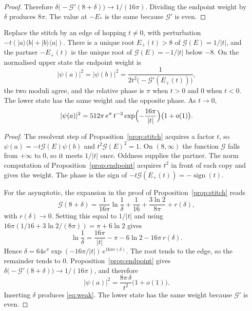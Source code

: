 \begin{proof}
Therefore \(\delta\bigl(-\mathcal{G}'(8+\delta)\bigr)\to 1/(16\pi)\).
Dividing the endpoint weight by \(\delta\) produces \(8\pi\).
The value at \(-E_*\) is the same because \(\mathcal{G}'\) is even.
\end{proof}

\begin{proposition}
\label{prop:weak}
Replace the stitch by an edge of hopping \(t\neq 0\), with perturbation
\(-t(|a\rangle\langle b|+|b\rangle\langle a|)\).
There is a unique root \(E_+(t)>8\) of \(\mathcal{G}(E)=1/|t|\), and the partner
\(-E_+(t)\) is the unique root of \(\mathcal{G}(E)=-1/|t|\) below \(-8\).
On the normalised upper state the endpoint weight is
\[
|\psi(a)|^2=|\psi(b)|^2
=\frac{1}{2t^2\bigl(-\mathcal{G}'(E_+(t))\bigr)},
\]
the two moduli agree, and the relative phase is \(\pi\) when \(t>0\) and
\(0\) when \(t<0\).
The lower state has the same weight and the opposite phase.
As \(t\to 0\),
\begin{equation}
\label{eq:weak}
|\psi(a)|^2
=512\pi\, e^{\pi}\, t^{-2}\exp\Bigl(-\frac{16\pi}{|t|}\Bigr)
\bigl(1+o(1)\bigr).
\end{equation}
\end{proposition}

\begin{proof}
The resolvent step of Proposition~\ref{prop:stitch} acquires a factor \(t\),
so \(\psi(a)=-t\mathcal{G}(E)\psi(b)\) and
\(t^2\mathcal{G}(E)^2=1\).
On \((8,\infty)\) the function \(\mathcal{G}\) falls from \(+\infty\) to \(0\),
so it meets \(1/|t|\) once.
Oddness supplies the partner.
The norm computation of Proposition~\ref{prop:endpoint} acquires \(t^2\) in
front of each copy and gives the weight.
The phase is the sign of \(-t\mathcal{G}(E_+(t))=-\operatorname{sign}(t)\).

For the asymptotic, the expansion in the proof of
Proposition~\ref{prop:stitch} reads
\[
\mathcal{G}(8+\delta)
=\frac{1}{16\pi}\ln\frac1\delta
+\frac1{16}+\frac{3\ln 2}{8\pi}+r(\delta),
\]
with \(r(\delta)\to 0\).
Setting this equal to \(1/|t|\) and using
\(16\pi(1/16+3\ln 2/(8\pi))=\pi+6\ln 2\) gives
\[
\ln\frac1\delta
=\frac{16\pi}{|t|}-\pi-6\ln 2-16\pi\, r(\delta).
\]
Hence
\(\delta=64 e^{\pi}\exp(-16\pi/|t|)\,e^{16\pi r(\delta)}\).
The root tends to the edge, so the remainder tends to \(0\).
Proposition~\ref{prop:endpoint} gives
\(\delta\bigl(-\mathcal{G}'(8+\delta)\bigr)\to 1/(16\pi)\), and therefore
\[
|\psi(a)|^2
=\frac{8\pi\,\delta}{t^2}\bigl(1+o(1)\bigr).
\]
Inserting \(\delta\) produces \eqref{eq:weak}.
The lower state has the same weight because \(\mathcal{G}'\) is even.
\end{proof}

